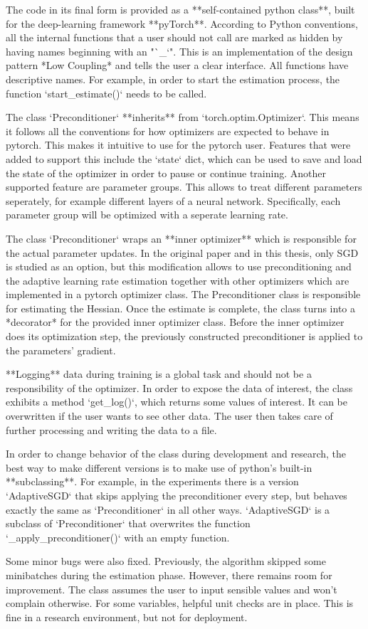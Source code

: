 \documentclass[twoside,12pt,a4paper]{report}
\begin{document}
\begin{markdown}
The code in its final form is provided as a **self-contained python class**, built for the deep-learning framework **pyTorch**. According to Python conventions, all the internal functions that a user should not call are marked as hidden by having names beginning with an "`_`". This is an implementation of the design pattern *Low Coupling* and tells the user a clear interface. All functions have descriptive names. For example, in order to start the estimation process, the function `start_estimate()` needs to be called.

The class `Preconditioner` **inherits** from `torch.optim.Optimizer`. This means it follows all the conventions for how optimizers are expected to behave in pytorch. This makes it intuitive to use for the pytorch user. Features that were added to support this include the `state` dict, which can be used to save and load the state of the optimizer in order to pause or continue training. Another supported feature are parameter groups. This allows to treat different parameters seperately, for example different layers of a neural network. Specifically, each parameter group will be optimized with a seperate learning rate.

The class `Preconditioner` wraps an **inner optimizer** which is responsible for the actual parameter updates. In the original paper and in this thesis, only SGD is studied as an option, but this modification allows to use preconditioning and the adaptive learning rate estimation together with other optimizers which are implemented in a pytorch optimizer class. The Preconditioner class is responsible for estimating the Hessian. Once the estimate is complete, the class turns into a *decorator* for the provided inner optimizer class. Before the inner optimizer does its optimization step, the previously constructed preconditioner is applied to the parameters' gradient.

**Logging** data during training is a global task and should not be a responsibility of the optimizer. In order to expose the data of interest, the class exhibits a method `get_log()`, which returns some values of interest. It can be overwritten if the user wants to see other data. The user then takes care of further processing and writing the data to a file.

In order to change behavior of the class during development and research, the best way to make different versions is to make use of python's built-in **subclassing**. For example, in the experiments there is a version `AdaptiveSGD` that skips applying the preconditioner every step, but behaves exactly the same as `Preconditioner` in all other ways. `AdaptiveSGD` is a subclass of `Preconditioner` that overwrites the function `_apply_preconditioner()` with an empty function.

Some minor bugs were also fixed. Previously, the algorithm skipped some minibatches during the estimation phase. However, there remains room for improvement. The class assumes the user to input sensible values and won't complain otherwise. For some variables, helpful unit checks are in place. This is fine in a research environment, but not for deployment.
\end{markdown}
\end{document}
